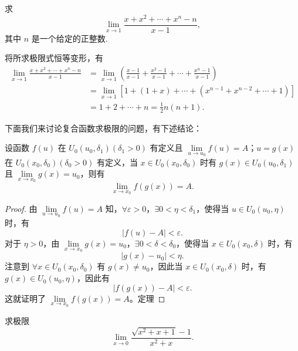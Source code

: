 \begin{example}\label{example:ma-3-1-5}
求
\[
  \lim_{x\to1}\frac{x+x^2+\cdots+x^n-n}{x-1},
\]
其中 $n$ 是一个给定的正整数.
\end{example}


\begin{solve}
将所求极限式恒等变形，有
\[
\begin{aligned}
  \lim_{x\to1}\frac{x+x^2+\cdots+x^n-n}{x-1}
  &=\lim_{x\to1}\left(\frac{x-1}{x-1}+\frac{x^2-1}{x-1}+\cdots+\frac{x^n-1}{x-1}\right)\\
  &=\lim_{x\to1}\left[1+(1+x)+\cdots+(x^{n-1}+x^{n-2}+\cdots+1)\right]\\
  &=1+2+\cdots+n=\frac12 n(n+1).
\end{aligned}
\]

下面我们来讨论复合函数求极限的问题，有下述结论：
\end{solve}


\begin{theorem}\label{theorem:ma-3-1-4}
设函数 $f(u)$ 在 $U_0(u_0,\delta_1)(\delta_1>0)$ 有定义且 $\lim\limits_{u\to u_0}f(u)=A$；$u=g(x)$ 在 $U_0(x_0,\delta_0)(\delta_0>0)$ 有定义，当 $x\in U_0(x_0,\delta_0)$ 时有 $g(x)\in U_0(u_0,\delta_1)$ 且 $\lim\limits_{x\to x_0}g(x)=u_0$，则有
\[
  \lim_{x\to x_0}f(g(x))=A.
\]
\end{theorem}


\begin{proof}
由 $\lim\limits_{u\to u_0}f(u)=A$ 知，$\forall\varepsilon>0$，$\exists 0<\eta<\delta_1$，使得当 $u\in U_0(u_0,\eta)$ 时，有
\[
  |f(u)-A|<\varepsilon.
\]
对于 $\eta>0$，由 $\lim\limits_{x\to x_0}g(x)=u_0$，$\exists 0<\delta<\delta_0$，使得当 $x\in U_0(x_0,\delta)$ 时，有
\[
  |g(x)-u_0|<\eta.
\]
注意到 $\forall x\in U_0(x_0,\delta_0)$ 有 $g(x)\ne u_0$，因此当 $x\in U_0(x_0,\delta)$ 时，有 $g(x)\in U_0(u_0,\eta)$，因此有
\[
  |f(g(x))-A|<\varepsilon.
\]
这就证明了 $\lim\limits_{x\to x_0}f(g(x))=A$。定理
\end{proof}


\begin{example}\label{example:ma-3-1-6}
求极限
\[
  \lim_{x\to0}\frac{\sqrt{x^2+x+1}-1}{x^2+x}.
\]
\end{example}


